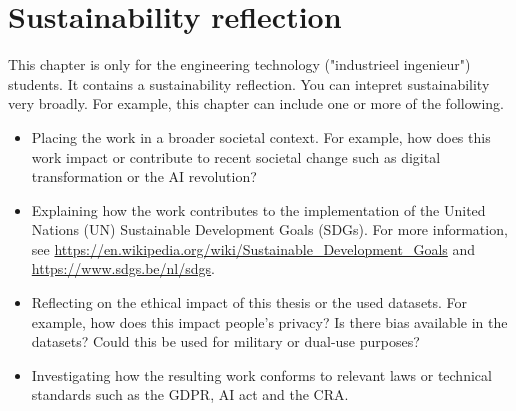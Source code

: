 \chapter*{Sustainability reflection}

This chapter is only for the engineering technology ("industrieel ingenieur") students. It contains a sustainability reflection. You can intepret sustainability very broadly. For example, this chapter can include one or more of the following.

\begin{itemize}
    \item Placing the work in a broader societal context. For example, how does this work impact or contribute to recent societal change such as digital transformation or the AI revolution?
    \item Explaining how the work contributes to the implementation of the United Nations (UN) Sustainable Development Goals (SDGs). For more information, see \url{https://en.wikipedia.org/wiki/Sustainable_Development_Goals} and \url{https://www.sdgs.be/nl/sdgs}.
    \item Reflecting on the ethical impact of this thesis or the used datasets. For example, how does this impact people's privacy? Is there bias available in the datasets? Could this be used for military or dual-use purposes?
    \item Investigating how the resulting work conforms to relevant laws or technical standards such as the GDPR, AI act and the CRA.
\end{itemize}

